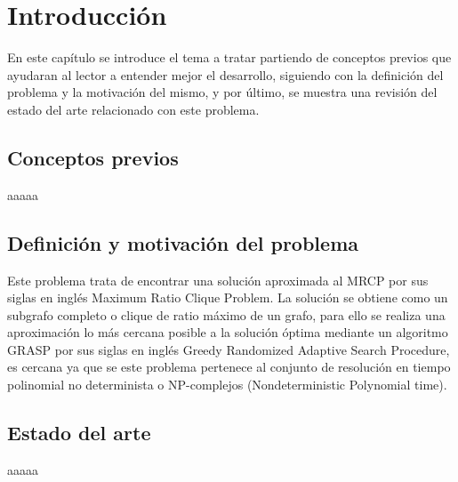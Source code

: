 
\chapter{Introducción} %

\label{Chapter1}


\newcommand{\keyword}[1]{\textbf{#1}}
\newcommand{\tabhead}[1]{\textbf{#1}}
\newcommand{\code}[1]{\texttt{#1}}
\newcommand{\file}[1]{\texttt{\bfseries#1}}
\newcommand{\option}[1]{\texttt{\itshape#1}}
\newcommand{\Mod}[1]{\ (\mathrm{mod}\ #1)}

En este capítulo se introduce el tema a tratar partiendo de conceptos previos que ayudaran al lector a entender mejor el desarrollo, siguiendo con la definición del problema y la motivación del mismo, y por último, se muestra una revisión del estado del arte relacionado con este problema.

\section{Conceptos previos}
aaaaa

\section{Definición y motivación del problema}
Este problema trata de encontrar una solución aproximada al MRCP por sus siglas en inglés Maximum Ratio Clique Problem. La solución se obtiene como un subgrafo completo o clique de ratio máximo de un grafo, para ello se realiza una aproximación lo más cercana posible a la solución óptima mediante un algoritmo GRASP por sus siglas en inglés Greedy Randomized Adaptive Search Procedure, es cercana ya que se este problema pertenece al conjunto de resolución en tiempo polinomial no determinista o NP-complejos (Nondeterministic Polynomial time).

\section{Estado del arte}
aaaaa


